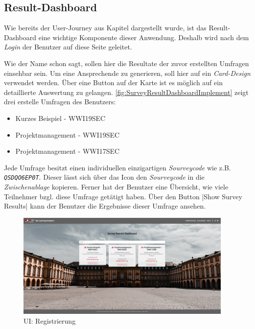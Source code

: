 \subsection{Result-Dashboard}
\label{ssec:ResultDashboardImplement}

Wie bereits der User-Journey aus Kapitel  dargestellt wurde, ist das Result-Dashboard eine wichtige Komponente dieser Anwendung. 
Deshalb wird nach dem \emph{Login} der Benutzer auf diese Seite geleitet. 

Wie der Name schon sagt, sollen hier die Resultate der zuvor erstellten Umfragen einsehbar sein. 
Um eine Ansprechende  zu generieren, soll hier auf ein \emph{Card-Design} verwendet werden. 
Über eine Button auf der Karte ist es möglich auf ein detaillierte Auswertung zu gelangen. \newline
\abb \vref{fig:SurveyResultDashboardImplement} zeigt drei erstelle Umfragen des Benutzers: 
% 
\begin{itemize}
	\item Kurzes Beispiel - WWI19SEC
	\item Projektmanagement - WWI19SEC
	\item Projektmanagement - WWI17SEC
\end{itemize}
% 
Jede Umfrage besitzt einen individuellen einzigartigen \emph{Sourveycode} wie z.B. \emph{\texttt{QSDQO6EP0T}}. 
Dieser lässt sich über das Icon \faClipboard\xspace den \emph{Sourveycode} in die \emph{Zwischenablage} kopieren. 
Ferner hat der Benutzer eine Übersicht, wie viele Teilnehmer  bzgl. diese Umfrage getätigt haben. 
Über den Button \jinline|Show Survey Results| kann der Benutzer die Ergebnisse dieser Umfrage ansehen. 

\begin{figure}[hp]
	\centering
	\includegraphics[width=0.95\textwidth, keepaspectratio]{img/client/SurveyResultDashboard.png}
	\captionsetup{justification=centering, format=plain}
	\caption[\acf{UI}: Registrierung]{\acf{UI}: Registrierung \\ \quelleScreenshot}
	\label{fig:SurveyResultDashboardImplement}
\end{figure}

